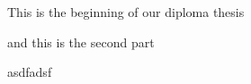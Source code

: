 \documentclass[a4paper, 11pt]{scrartcl}
\begin{document}
 
    This is the beginning of our diploma thesis

    and this is the second part
    
    asdfadsf
\end{document}
